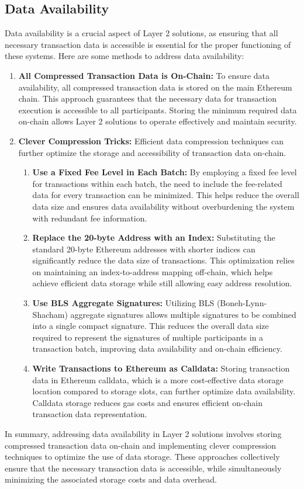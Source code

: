 \subsection{Data Availability}
Data availability is a crucial aspect of Layer 2 solutions, as ensuring that all necessary transaction data is accessible is essential for the proper functioning of these systems. Here are some methods to address data availability:
\begin{enumerate}
	\item \textbf{All Compressed Transaction Data is On-Chain:} To ensure data availability, all compressed transaction data is stored on the main Ethereum chain. This approach guarantees that the necessary data for transaction execution is accessible to all participants. Storing the minimum required data on-chain allows Layer 2 solutions to operate effectively and maintain security.
	\item \textbf{Clever Compression Tricks:} Efficient data compression techniques can further optimize the storage and accessibility of transaction data on-chain.
	\begin{enumerate}
		\item \textbf{Use a Fixed Fee Level in Each Batch:} By employing a fixed fee level for transactions within each batch, the need to include the fee-related data for every transaction can be minimized. This helps reduce the overall data size and ensures data availability without overburdening the system with redundant fee information.
		\item \textbf{Replace the 20-byte Address with an Index:} Substituting the standard 20-byte Ethereum addresses with shorter indices can significantly reduce the data size of transactions. This optimization relies on maintaining an index-to-address mapping off-chain, which helps achieve efficient data storage while still allowing easy address resolution.
		\item \textbf{Use BLS Aggregate Signatures:} Utilizing BLS (Boneh-Lynn-Shacham) aggregate signatures allows multiple signatures to be combined into a single compact signature. This reduces the overall data size required to represent the signatures of multiple participants in a transaction batch, improving data availability and on-chain efficiency.
		\item \textbf{Write Transactions to Ethereum as Calldata:} Storing transaction data in Ethereum calldata, which is a more cost-effective data storage location compared to storage slots, can further optimize data availability. Calldata storage reduces gas costs and ensures efficient on-chain transaction data representation.
	\end{enumerate}
\end{enumerate}
In summary, addressing data availability in Layer 2 solutions involves storing compressed transaction data on-chain and implementing clever compression techniques to optimize the use of data storage. These approaches collectively ensure that the necessary transaction data is accessible, while simultaneously minimizing the associated storage costs and data overhead.
